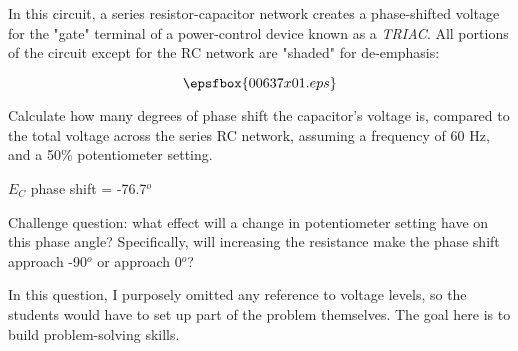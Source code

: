 

In this circuit, a series resistor-capacitor network creates a phase-shifted voltage for the "gate" terminal of a power-control device known as a {\it TRIAC}.  All portions of the circuit except for the RC network are "shaded" for de-emphasis:

$$\epsfbox{00637x01.eps}$$

Calculate how many degrees of phase shift the capacitor's voltage is, compared to the total voltage across the series RC network, assuming a frequency of 60 Hz, and a 50\% potentiometer setting.







$E_C$ phase shift = -76.7$^{o}$

\vskip 10pt

Challenge question: what effect will a change in potentiometer setting have on this phase angle?  Specifically, will increasing the resistance make the phase shift approach -90$^{o}$ or approach 0$^{o}$?







In this question, I purposely omitted any reference to voltage levels, so the students would have to set up part of the problem themselves.  The goal here is to build problem-solving skills.




